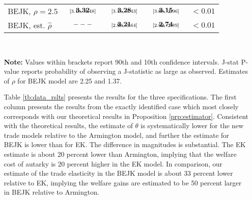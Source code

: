 \documentclass[12pt,dvips, ps2pdf]{article}
\begin{document}
\begin{table}[!h]
\begin{center}
\begin{tabular}[t]{l c c c c }
BEJK, $\rho = 2.5$            & $\begin{array}{c}{\textbf{3.32}} \vspace{-.4cm}\\ \scriptstyle{[3.18,   \ 3.48]}\end{array}$ &  $\begin{array}{c}{\textbf{3.28}} \vspace{-.4cm}\\ \scriptstyle{[3.16,   \ 3.43]}\end{array}$   &  $\begin{array}{c}{\textbf{3.15}} \vspace{-.4cm}\\ \scriptstyle{[3.08,   \ 2.96]}\end{array}$  & $< 0.01$          \\
BEJK, est. $\hat{\rho}$            & $\begin{array}{c}{---} \vspace{-.4cm}\\ \scriptstyle{}\end{array}$ &  $\begin{array}{c}{\textbf{3.21}} \vspace{-.4cm}\\ \scriptstyle{[2.90,   \ 3.64]}\end{array}$   &  $\begin{array}{c}{\textbf{2.74}} \vspace{-.4cm}\\ \scriptstyle{[2.62,   \ 2.89]}\end{array}$   & $< 0.01$          \\
\hline
\end{tabular}
\\[0.75ex]
\parbox{5.7in}{\footnotesize \textbf{Note:} Values within brackets report 90th and 10th confidence intervals. J-stat P-value reports probability of observing a J-statistic as large as observed. Estimates of $\rho$ for BEJK model are 2.25 and 1.37.}
\end{center}
\end{table}

Table \ref{tb:data_rslts} presents the results for the three specifications. The first column presents the results from the exactly identified case which most closely corresponds with our theoretical results in Proposition \ref{prp:estimator}. Consistent with the theoretical results, the estimate of $\theta$ is systematically lower for the new trade models relative to the Armington model, and further the estimate for BEJK is lower than for EK. The difference in magnitudes is substantial. The EK estimate is about 20 percent lower than Armington, implying that the welfare cost of autarky is 20 percent higher in the EK model. In comparison, our estimate of the trade elasticity in the BEJK model is about 33 percent lower relative to EK, implying the welfare gains are estimated to be 50 percent larger in BEJK relative to Armington.
\end{document}
